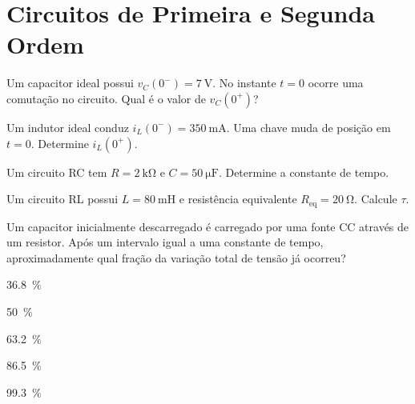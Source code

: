 \gabarito[10.2 Indutores]

\section{Circuitos de Primeira e Segunda Ordem}

\blocofixacao
\begin{questao}[1]{}

Um capacitor ideal possui $v_C(0^-)=\SI{7}{\volt}$. No instante $t=0$ ocorre uma
comutação no circuito. Qual é o valor de $v_C(0^+)$?


\end{questao}
\begin{questao}[1]{}

Um indutor ideal conduz $i_L(0^-)=\SI{350}{\milli\ampere}$. Uma chave muda de
posição em $t=0$. Determine $i_L(0^+)$.


\end{questao}
\begin{questao}[1]{}

Um circuito RC tem $R=\SI{2}{\kilo\ohm}$ e $C=\SI{50}{\micro\farad}$. Determine
a constante de tempo.


\end{questao}
\begin{questao}[1]{}

Um circuito RL possui $L=\SI{80}{\milli\henry}$ e resistência equivalente
$R_{\mathrm{eq}}=\SI{20}{\ohm}$. Calcule $\tau$.


\end{questao}
\begin{questao}[1]{}

Um capacitor inicialmente descarregado é carregado por uma fonte CC através de
um resistor. Após um intervalo igual a uma constante de tempo, aproximadamente
qual fração da variação total de tensão já ocorreu?
\begin{alternativas}[3]
\item \SI{36.8}{\percent}
\item \SI{50}{\percent}
\item \SI{63.2}{\percent}
\item \SI{86.5}{\percent}
\item \SI{99.3}{\percent}
\end{alternativas}


\end{questao}
